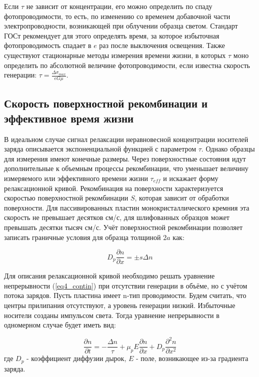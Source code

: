 Если $\tau$ не зависит от концентрации, его можно определить по спаду фотопроводимости, то есть, по изменению со временем добавочной части электропроводности, возникающей при облучении образца светом. Стандарт ГОСт рекомендует для этого определять время, за которое избыточная фотопроводимость спадает в $e$ раз после выключения освещения. Также существуют стационарные методы измерения времени жизни, в которых $\tau$ моно определить по абсолютной величине фотопроводимости, если известна скорость генерации: $\tau = \frac{\Delta \sigma_{max}}{e G \mu}$.

\subsection{Скорость поверхностной рекомбинации и эффективное время жизни}

В идеальном случае сигнал релаксации неравновесной концентрации носителей заряда описывается экспоненциальной функцией с параметром $\tau$. Однако образцы для измерения имеют конечные размеры. Через поверхностные состояния идут дополнительные к объемным процессы рекомбинации, что уменьшает величину измеряемого или эффективного времени жизни $\tau_{eff}$ и искажает форму релаксационной кривой. Рекомбинация на поверхности характеризуется скоростью поверхностной рекомбинации $S$, которая зависит от обработки поверхности. Для пассивированных пластин монокристаллического кремния эта скорость не превышает десятков см/с, для шлифованных образцов может превышать десятки тысяч см/с. Учёт поверхностной рекомбинации позволяет записать граничные условия для образца толщиной $2 a$ как:

\begin{equation}
D_{p} \frac{\partial n}{\partial x} = \pm s \Delta n
\end{equation}

Для описания релаксационной кривой необходимо решать уравнение непрерывности (\ref{eq4_contin}) при отсутствии генерации в объёме, но с учётом потока зарядов. Пусть пластина имеет n-тип проводимости. Будем считать, что центры прилипания отсутствуют, а уровень генерации низкий. Избыточные носители созданы импульсом света. Тогда уравнение непрерывности в одномерном случае будет иметь вид:

\begin{equation}
\frac{\partial n}{\partial t} = -\frac{\Delta n}{\tau} + \mu_{p} E \frac{\partial n}{\partial x} + D_{p} \frac{\partial^2 n}{\partial x^2}
\label{eq4_relaxation}
\end{equation}
где $D_{p}$ - коэффициент диффузии дырок, $E$ - поле, возникающее из-за градиента заряда.

